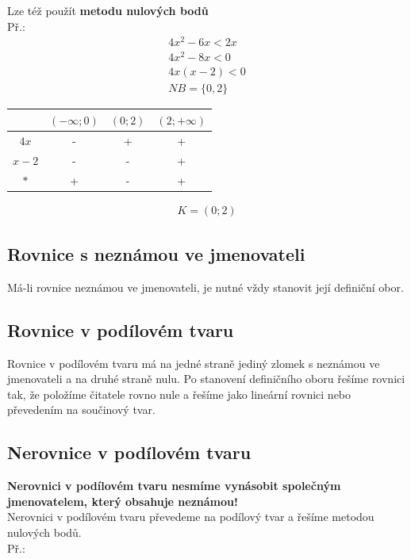 \documentclass[12pt, a4paper]{article}
\begin{document}
Lze též použít \textbf{metodu nulových bodů}\\
Př.:\\
\[\begin{aligned}
4x^2 - 6x < 2x\\
4x^2 - 8x < 0\\
4x(x-2)<0\\
NB = \{0,2\}
\end{aligned}\]

\begin{center}
\begin{tabular}{| c | c | c | c |}
\hline
 & $(-\infty;0)$ & $(0;2)$ & $(2;+\infty)$\\
\hline
$4x$ & - & + & +\\
\hline
$x-2$ & - & - & +\\
\hline
$*$ & + & - & +\\
\hline
\end{tabular}
\end{center}

\[\begin{aligned}
K = (0;2)
\end{aligned}\]

\subsection*{Rovnice s neznámou ve jmenovateli}
Má-li rovnice neznámou ve jmenovateli, je nutné vždy stanovit její definiční obor.

\subsection*{Rovnice v podílovém tvaru}
Rovnice v podílovém tvaru má na jedné straně jediný zlomek s neznámou ve jmenovateli a na druhé straně nulu. Po stanovení definičního oboru řešíme rovnici tak,
že položíme čitatele rovno nule a řešíme jako lineární rovnici nebo převedením na součinový tvar.

\pagebreak

\subsection*{Nerovnice v podílovém tvaru}
\textbf{Nerovnici v podílovém tvaru nesmíme vynásobit společným jmenovatelem, který obsahuje neznámou!}\\
Nerovnici v podílovém tvaru převedeme na podílový tvar a řešíme metodou nulových bodů.\\
Př.:\\
\end{document}
